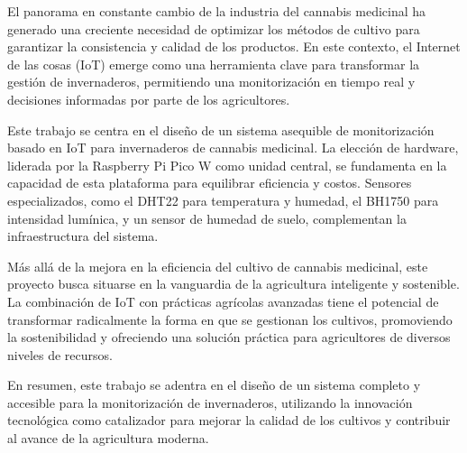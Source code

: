 
El panorama en constante cambio de la industria del cannabis medicinal ha generado una creciente necesidad de optimizar los métodos de cultivo para garantizar la consistencia y calidad de los productos. En este contexto, el Internet de las cosas (IoT) emerge como una herramienta clave para transformar la gestión de invernaderos, permitiendo una monitorización en tiempo real y decisiones informadas por parte de los agricultores.

Este trabajo se centra en el diseño de un sistema asequible de monitorización basado en IoT para invernaderos de cannabis medicinal. La elección de hardware, liderada por la Raspberry Pi Pico W como unidad central, se fundamenta en la capacidad de esta plataforma para equilibrar eficiencia y costos. Sensores especializados, como el DHT22 para temperatura y humedad, el BH1750 para intensidad lumínica, y un sensor de humedad de suelo, complementan la infraestructura del sistema.

Más allá de la mejora en la eficiencia del cultivo de cannabis medicinal, este proyecto busca situarse en la vanguardia de la agricultura inteligente y sostenible. La combinación de IoT con prácticas agrícolas avanzadas tiene el potencial de transformar radicalmente la forma en que se gestionan los cultivos, promoviendo la sostenibilidad y ofreciendo una solución práctica para agricultores de diversos niveles de recursos.

En resumen, este trabajo se adentra en el diseño de un sistema completo y accesible para la monitorización de invernaderos, utilizando la innovación tecnológica como catalizador para mejorar la calidad de los cultivos y contribuir al avance de la agricultura moderna.
